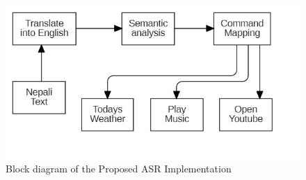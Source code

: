\begin{figure}[h]
\centering
    \includegraphics[scale=0.5]{images/Implementation Flowchart.jpg}
    \caption{Block diagram of the Proposed ASR Implementation }
    \label{fig:my_label}
\end{figure}
